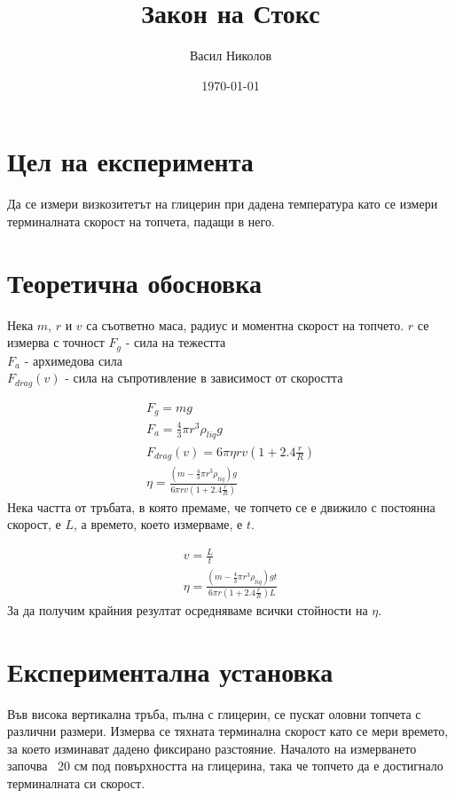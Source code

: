 \documentclass[aps, prb, twocolumn, a4paper]{revtex4-2}
\begin{document}
\title{Закон на Стокс}
\author{Васил Николов}
\noaffiliation
\date{\today}

\maketitle

\section{Цел на експеримента}
Да се измери визкозитетът на глицерин при дадена температура като се измери терминалната скорост на топчета, падащи в него.

\section{Теоретична обосновка}

Нека $m$, $r$ и $v$ са съответно маса, радиус и моментна скорост на топчето. $r$ се измерва с точност 
$F_g$ - сила на тежестта\\
$F_a$ - архимедова сила \\ 
$F_{drag}(v)$ - сила на съпротивление в зависимост от скоростта 

\begin{gather*}
    F_g = mg \\
    F_a = \frac{4}{3}\pi r^3\rho_{liq}g \\
    F_{drag}(v) = 6\pi\eta rv(1 + 2.4\frac{r}{R})\\
    \eta = \frac{(m-\frac{4}{3}\pi r^3\rho_{liq})g}{6\pi rv(1+2.4\frac{r}{R})}
\end{gather*}
Нека частта от тръбата, в която премаме, че топчето се е движило с постоянна скорост, е $L$, а времето, което измерваме, е $t$. 

\begin{gather*}
    v = \frac{L}{t} \\
    \eta = \frac{(m-\frac{4}{3}\pi r^3\rho_{liq})gt}{6\pi r(1+2.4\frac{r}{R})L}
\end{gather*}
За да получим крайния резултат осредняваме всички стойности на $\eta$. 

\section{Експериментална установка}

Във висока вертикална тръба, пълна с глицерин, се пускат оловни топчета с различни размери. Измерва се тяхната терминална скорост като се мери времето, за което изминават дадено фиксирано разстояние. Началото на измерването започва ~20 см под повърхността на глицерина, така че топчето да е достигнало терминалната си скорост.
\end{document}
